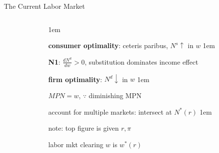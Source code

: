 \documentclass[11pt,aspectratio=43,usenames,dvipsnames]{beamer}
\let\olditemize=\itemize
\let\endolditemize=\enditemize
\renewenvironment{itemize}{\olditemize \itemsep1em}{\endolditemize}
\theoremstyle{definition}
\begin{document}
\begin{frame}{The Current Labor Market}
\begin{columns}
\begin{column}{0.5\textwidth}
\begin{tikzpicture}
            \end{tikzpicture}
        \end{column}
        \begin{column}{0.5\textwidth}
            \begin{itemize}
                \item \textbf{consumer optimality}: ceteris paribus, $ N^{s} \uparrow  $ in $ w $
                \begin{itemize}
                    \item \textbf{N1}: $ \displaystyle \frac{d N^{S}}{dw} > 0 $, substitution dominates income effect
                \end{itemize}
                \item \textbf{firm optimality}: $ N^{d} \downarrow  $ in $ w $
                \begin{itemize}
                    \item $ MPN = w $, $ \because $ diminishing MPN
                \end{itemize}
                \item account for \alert{multiple markets}: intersect at \alert{$N^{*}( r )$}
                \begin{itemize}
                    \item note: top figure is given $ r, \pi $
                    \item labor mkt clearing $ w $ is $ w^{*}( r ) $
                \end{itemize}
            \end{itemize}
        \end{column}
    \end{columns}
\end{frame}
\end{document}

